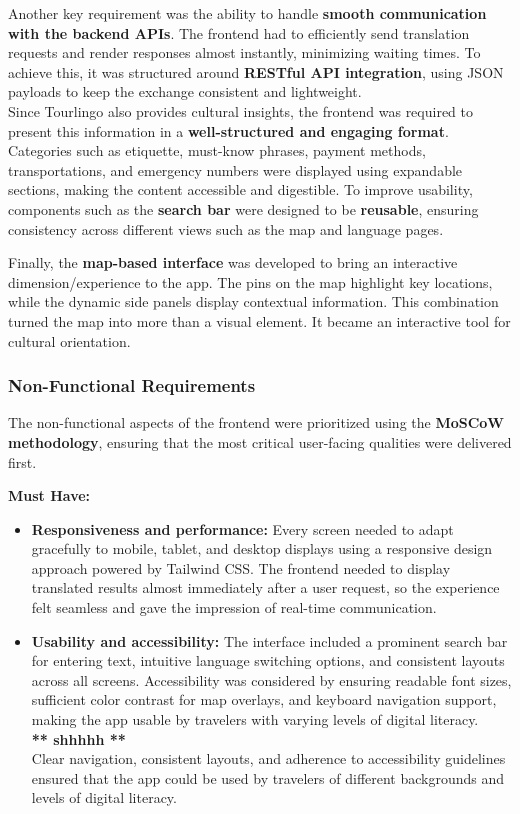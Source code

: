 Another key requirement was the ability to handle \textbf{smooth communication with the backend APIs}. The frontend had to efficiently send translation requests and render responses almost instantly, minimizing waiting times. To achieve this, it was structured around \textbf{RESTful API integration}, using JSON payloads to keep the exchange consistent and lightweight.  \\

Since Tourlingo also provides cultural insights, the frontend was required to present this information in a \textbf{well-structured and engaging format}. Categories such as etiquette,  must-know phrases, payment methods, transportations, and emergency numbers were displayed using expandable sections, making the content accessible and digestible. To improve usability, components such as the \textbf{search bar} were designed to be \textbf{reusable}, ensuring consistency across different views such as the map and language pages.  

Finally, the \textbf{map-based interface} was developed to bring an interactive dimension/experience to the app. The pins on the map highlight key locations, while the dynamic side panels display contextual information. This combination turned the map into more than a visual element. It became an interactive tool for cultural orientation.  

\subsubsection{Non-Functional Requirements}

The non-functional aspects of the frontend were prioritized using the \textbf{MoSCoW methodology}, ensuring that the most critical user-facing qualities were delivered first.  

\textbf{Must Have:}  
\begin{itemize}
    \item \textbf{Responsiveness and performance:} Every screen needed to adapt gracefully to mobile, tablet, and desktop displays using a responsive design approach powered by Tailwind CSS. The frontend needed to display translated results almost immediately after a user request, so the experience felt seamless and gave the impression of real-time communication.

    \item \textbf{Usability and accessibility:}  The interface included a prominent search bar for entering text, intuitive language switching options, and consistent layouts across all screens. Accessibility was considered by ensuring readable font sizes, sufficient color contrast for map overlays, and keyboard navigation support, making the app usable by travelers with varying levels of digital literacy. \\
    \textbf{** shhhhh **}\\
    Clear navigation, consistent layouts, and adherence to accessibility guidelines ensured that the app could be used by travelers of different backgrounds and levels of digital literacy.  
\end{itemize}

